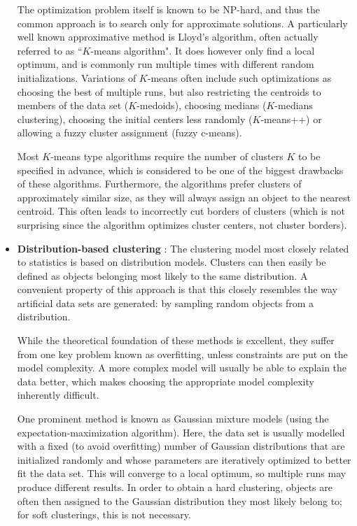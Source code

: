 \begin{itemize}
The optimization problem itself is known to be NP-hard, and thus the common approach is to search only for approximate
solutions. A particularly well known approximative method is Lloyd's algorithm, often actually referred to as
``$K$-means algorithm". It does however only find a local optimum, and is commonly run multiple times with different
random initializations. Variations of $K$-means often include such optimizations as choosing the best of multiple runs,
but also restricting the centroids to members of the data set ($K$-medoids), choosing medians ($K$-medians clustering),
choosing the initial centers less randomly ($K$-means++) or allowing a fuzzy cluster assignment (fuzzy c-means).

Most $K$-means type algorithms require the number of clusters $K$ to be specified in advance, which is considered
to be one of the biggest drawbacks of these algorithms. Furthermore, the algorithms prefer clusters of approximately
similar size, as they will always assign an object to the nearest centroid. This often leads to incorrectly cut
borders of clusters (which is not surprising since the algorithm optimizes cluster centers, not cluster borders).

\item \textbf{Distribution-based clustering} : The clustering model most closely related to statistics is based
on distribution models. Clusters can then easily be defined as objects belonging most likely to the same distribution.
A convenient property of this approach is that this closely resembles the way artificial data sets are generated:
by sampling random objects from a distribution.

While the theoretical foundation of these methods is excellent, they suffer from one key problem known as overfitting,
unless constraints are put on the model complexity. A more complex model will usually be able to explain the data better,
which makes choosing the appropriate model complexity inherently difficult.

One prominent method is known as Gaussian mixture models (using the expectation-maximization algorithm). Here,
the data set is usually modelled with a fixed (to avoid overfitting) number of Gaussian distributions that are
initialized randomly and whose parameters are iteratively optimized to better fit the data set. This will converge
to a local optimum, so multiple runs may produce different results. In order to obtain a hard clustering, objects
are often then assigned to the Gaussian distribution they most likely belong to; for soft clusterings, this is not
necessary.


\end{itemize}
